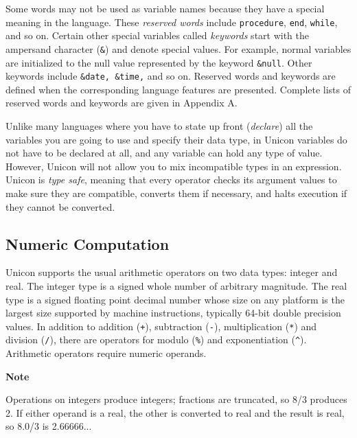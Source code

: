 Some words may not be used as variable names because they have a special
meaning in the language. These \textit{reserved
word}\textit{s} include \texttt{procedure}, \texttt{end},
\texttt{while}, and so on. Certain other special variables called
\textit{keyword}\textit{s} start with the ampersand
character (\texttt{\&}) and denote special values. For example, normal
variables are initialized to the null value represented by the keyword
\texttt{\&}\texttt{null}. Other keywords
include \texttt{\&date}\texttt{, }\texttt{\&time}\texttt{,} and so on.
Reserved words and keywords are defined when the corresponding language
features are presented. Complete lists of reserved words and keywords
are given in Appendix A.

Unlike many languages where you have to state up front
(\textit{declare}) all the variables you are going to use\textit{ }and
specify their data type, in Unicon variables do not have to be declared
at all, and any variable can hold any type of value. However, Unicon
will not allow you to mix incompatible types in an expression. Unicon
is \textit{type safe}, meaning that every operator
checks its argument values to make sure they are compatible, converts
them if necessary, and halts execution if they cannot be converted.

\subsection[Numeric Computation]{Numeric Computation}
Unicon supports the usual arithmetic operators on two
data types: integer and real. The integer type is a
signed whole number of arbitrary magnitude. The real type is a signed
floating point decimal number whose size on any
platform is the largest size supported by machine instructions,
typically 64-bit double precision values. In addition to
addition (\texttt{+}), subtraction
(\texttt{{}-}), multiplication (\texttt{*}) and
division (\texttt{/}), there are operators for
modulo (\texttt{\%}) and exponentiation (\texttt{\^{}}). Arithmetic operators require
numeric operands.

{\sffamily\bfseries
Note}

{\sffamily
Operations on integers produce integers; fractions are truncated, so 8/3
produces 2. If either operand is a real, the other is converted to real
and the result is real, so 8.0/3 is 2.66666...}

